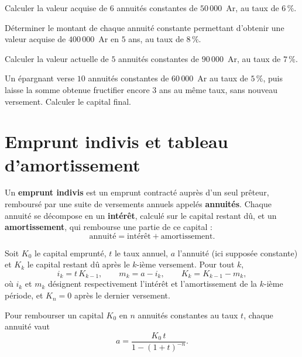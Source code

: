 \begin{entrainement}
\exo[\niveau{1}] Calculer la valeur acquise de $6$ annuités constantes de
$50\,000$~Ar, au taux de $6\,\%$.

\exo[\niveau{2}] Déterminer le montant de chaque annuité constante permettant
d'obtenir une valeur acquise de $400\,000$~Ar en $5$ ans, au taux de $8\,\%$.

\exo[\niveau{2}] Calculer la valeur actuelle de $5$ annuités constantes de
$90\,000$~Ar, au taux de $7\,\%$.

\exo[\niveau{3}] Un épargnant verse $10$ annuités constantes de $60\,000$~Ar
au taux de $5\,\%$, puis laisse la somme obtenue fructifier encore $3$ ans au
même taux, sans nouveau versement. Calculer le capital final.
\end{entrainement}

\section{Emprunt indivis et tableau d'amortissement}

\begin{definition}
Un \textbf{emprunt indivis} est un emprunt contracté auprès d'un seul
prêteur, remboursé par une suite de versements annuels appelés
\textbf{annuités}. Chaque annuité se décompose en un \textbf{intérêt}, calculé
sur le capital restant dû, et un \textbf{amortissement}, qui rembourse une
partie de ce capital :
\[
  \text{annuité} = \text{intérêt}+\text{amortissement} .
\]
\end{definition}

\begin{propriete}
Soit $K_{0}$ le capital emprunté, $t$ le taux annuel, $a$ l'annuité (ici
supposée constante) et $K_{k}$ le capital restant dû après le $k$-ième
versement. Pour tout $k$,
\[
  i_{k} = t\,K_{k-1}, \qquad
  m_{k} = a-i_{k}, \qquad
  K_{k} = K_{k-1}-m_{k},
\]
où $i_{k}$ et $m_{k}$ désignent respectivement l'intérêt et l'amortissement
de la $k$-ième période, et $K_{n} = 0$ après le dernier versement.
\end{propriete}

\begin{theoreme}
Pour rembourser un capital $K_{0}$ en $n$ annuités constantes au taux $t$,
chaque annuité vaut
\[
  a = \frac{K_{0}\,t}{1-(1+t)^{-n}} .
\]
\end{theoreme}

